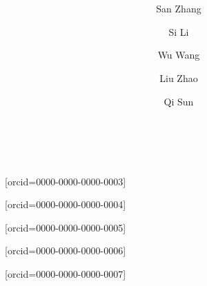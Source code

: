 \documentclass[a4paper,fleqn]{cas-dc}
\begin{document}
\title[mode=title]{\ }

\author[1,2,3]{San Zhang}[orcid=0000-0000-0000-0003]\fnmark[1]

\author[1,2]{Si Li}[orcid=0000-0000-0000-0004]\fnmark[1]

\author[1]{Wu Wang}[orcid=0000-0000-0000-0005]

\author[1]{Liu Zhao}[orcid=0000-0000-0000-0006]\cormark[1]

\author[1]{Qi Sun}[orcid=0000-0000-0000-0007]\cormark[1]

\address[1]{Department/College/School/Faculty/Institute/... A, University A, City A, Country/Region A}
\address[2]{Department/College/School/Faculty/Institute/... B, University B, City B, Country/Region B}
\address[3]{Department/College/School/Faculty/Institute/... C, University C, City C, Country/Region C}


\begin{abstract}
	\ 
\end{abstract}

\begin{keywords}
	
\end{keywords}

\maketitle








\printcredits



\end{document}
